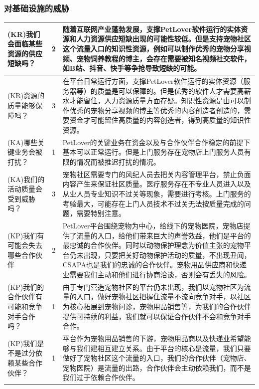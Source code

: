 \documentclass[a4paper]{ctexart}
\begin{document}
\subsubsection{对基础设施的威胁}
\begin{table}[h]
  \centering
\begin{tabular}{|p{3.5cm}|c|p{10cm}|}
  \hline
  (KR)我们会面临某些资源的供应短缺吗？ & 2 & 随着互联网产业蓬勃发展，支撑PetLover软件运行的实体资源和人力资源供应短缺出现的可能性较低。但是支持宠物社区这个流量入口的知识性资源，例如可以制作优秀的宠物分享视频、宠物饲养教程的博主，会存在需要被知名视频社交软件，如B站、抖音、快手等争抢导致短缺的可能。\\
  \hline
  (KR)资源的质量能够保障吗？ & 3 & 在平台日常运行方面，支撑PetLover软件运行的实体资源（服务器等）的质量是可以保障的。但是优秀的软件人才需要高薪水才能留住，人力资源质量方面存疑。知识性资源是由可以制作优秀的宠物分享视频的博主等优秀的内容创造者创造的，需要资金才可能留住高质量的内容创造者，得到高质量的知识性资源。\\
  \hline
  (KA)哪些关键业务会被打扰？& 1 & PetLover的关键业务在资金以及与合作伙伴合作稳定的前提下基本可以正常运行。但是上门服务存在宠物店上门服务人员有限的情况而被推迟打扰的情况。\\
  \hline
  (KA)我们的活动质量会受到威胁吗？& 3 & 宠物社区需要专门的风纪人员去把关内容管理平台，禁止负面内容产生来保证社区质量。医疗服务存在不专业人员进入以及从业人员专业知识不过关等现象，需要进行考核。上门服务的考验最大，可能存在上门人员技术不过关无法按质量完成的问题，需要特别注意。\\
  \hline
  (KP)我们有可能会失去哪些合作伙伴& 2 & PetLover平台围绕宠物为中心，给线下的宠物医院，宠物店提供了流量的入口，给他们带来巨大的声誉效益，他们是平台的最忠诚的合作伙伴。同时以动物保护理念为价值主张的宠物平台仍未出现，只要把关好动物保护活动的质量，不出现丑闻，CSAPA也是我们的忠诚的合作伙伴。宠物用品供应商和快递业需要我们主动和他们进行协商洽谈，否则会有丢失的风险。\\
  \hline
  (KP)我们的合作伙伴有可能和竞争对手合作吗？& 1 & 由于专门营造宠物社区的平台仍未出现，我们以宠物社区为流量的入口，做好宠物社区把握住流量不流向竞争对手，以社区为核心拓展到宠物问诊，宠物用品销售等，为我们的合作伙伴提供可持续的利益，我们就可以保证合作伙伴不会和竞争对手合作。\\
  \hline
  (KP)我们是不是过分依赖某些合作伙伴？& 1 & 平台作为宠物用品销售的下游，宠物用品商以及快递业希望能够与我们建相互建立关系。由于平台的核心是流量，我们只要做好了宠物社区这个流量的入口，我们的合作伙伴（宠物店、宠物医院）是流量的出路，合作伙伴会主动依赖我们，而不是我们过于依赖合作伙伴。\\
  \hline
\end{tabular}
\end{table}
\end{document}
